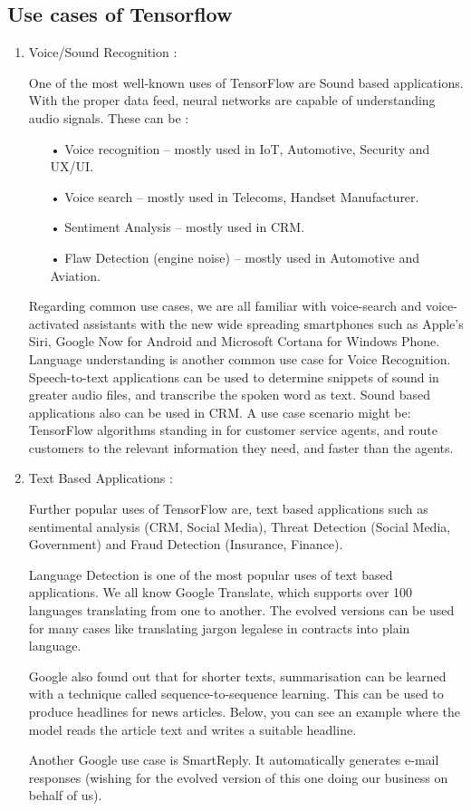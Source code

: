 \documentclass[14pt,a4paper]{article}
\begin{document}
\subsection{Use cases of Tensorflow}
\begin{enumerate}
\item Voice/Sound Recognition :
\par One of the most well-known uses of TensorFlow are Sound based applications. With the proper data feed, neural networks are capable of understanding audio signals. These can be :
\begin{itemize}
\item[•] Voice recognition – mostly used in IoT, Automotive, Security and UX/UI.
\item[•] Voice search – mostly used in Telecoms, Handset Manufacturer.
\item[•] Sentiment Analysis – mostly used in CRM.
\item[•] Flaw Detection (engine noise) – mostly used in Automotive and Aviation.
\end{itemize}
\par Regarding common use cases, we are all familiar with voice-search and voice-activated assistants with the new wide spreading smartphones such as Apple’s Siri, Google Now for Android and Microsoft Cortana for Windows Phone.
Language understanding is another common use case for Voice Recognition. Speech-to-text applications can be used to determine snippets of sound in greater audio files, and transcribe the spoken word as text.
Sound based applications also can be used in CRM. A use case scenario might be: TensorFlow algorithms standing in for customer service agents, and route customers to the relevant information they need, and faster than the agents.

\item Text Based Applications :
\par Further popular uses of TensorFlow are, text based applications such as sentimental analysis (CRM, Social Media), Threat Detection (Social Media, Government) and Fraud Detection (Insurance, Finance).
\par Language Detection is one of the most popular uses of text based applications. We all know Google Translate, which supports over 100 languages translating from one to another. The evolved versions can be used for many cases like translating jargon legalese in contracts into plain language.
\par Google also found out that for shorter texts, summarisation can be learned with a technique called sequence-to-sequence learning. This can be used to produce headlines for news articles. Below, you can see an example where the model reads the article text and writes a suitable headline.
\par Another Google use case is SmartReply. It automatically generates e-mail responses (wishing for the evolved version of this one doing our business on behalf of us).


\end{enumerate}
\end{document}
